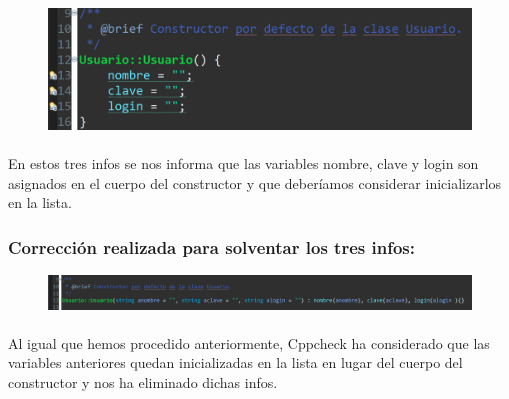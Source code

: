 			\begin{figure}[H]
				\centering
				\includegraphics[scale=0.55]{img/esteban28.png}
				\label{esteban28}
			\end{figure}
		
			\paragraph{}En estos tres infos se nos informa que las variables nombre, clave y login son asignados en el cuerpo del constructor y que deberíamos considerar inicializarlos en la lista.
			
		\subsubsection{Corrección realizada para solventar los tres infos:}
		
			\begin{figure}[H]
				\centering
				\includegraphics[scale=0.55]{img/esteban29.png}
				\label{esteban29}
			\end{figure}
		
			\paragraph{}Al igual que hemos procedido anteriormente, Cppcheck ha considerado que las variables anteriores quedan inicializadas en la lista en lugar del cuerpo del constructor y nos ha eliminado dichas infos.